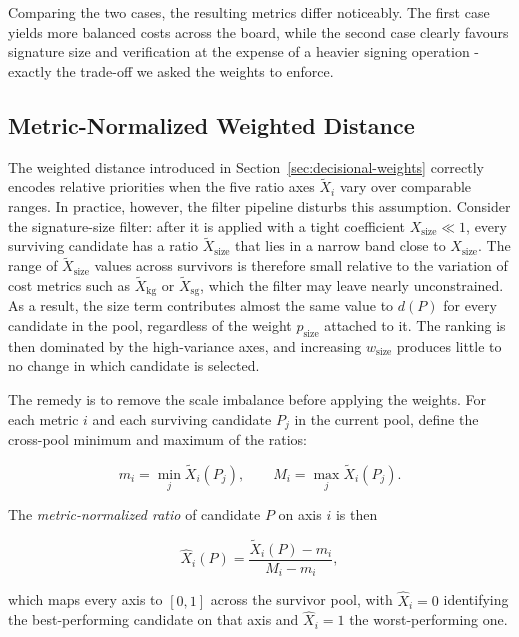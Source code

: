 Comparing the two cases, the resulting metrics differ noticeably. The first case yields more balanced costs across the board, while the second case clearly favours signature size and verification at the expense of a heavier signing operation - exactly the trade-off we asked the weights to enforce. 

\subsection{Metric-Normalized Weighted Distance} \label{sec:normalized-weights}

The weighted distance introduced in Section~\ref{sec:decisional-weights} correctly encodes relative priorities when the five ratio axes $\widetilde{X}_i$ vary over comparable ranges.
In practice, however, the filter pipeline disturbs this assumption.
Consider the signature-size filter: after it is applied with a tight coefficient $X_{\text{size}} \ll 1$, every surviving candidate has a ratio $\widetilde{X}_{\text{size}}$ that lies in a narrow band close to $X_{\text{size}}$.
The range of $\widetilde{X}_{\text{size}}$ values across survivors is therefore small relative to the variation of cost metrics such as $\widetilde{X}_{\text{kg}}$ or $\widetilde{X}_{\text{sg}}$, which the filter may leave nearly unconstrained.
As a result, the size term contributes almost the same value to $d(P)$ for every candidate in the pool, regardless of the weight $p_{\text{size}}$ attached to it.
The ranking is then dominated by the high-variance axes, and increasing $w_{\text{size}}$ produces little to no change in which candidate is selected.

The remedy is to remove the scale imbalance before applying the weights.
For each metric $i$ and each surviving candidate $P_j$ in the current pool, define the cross-pool minimum and maximum of the ratios:

\begin{equation}
    m_i = \min_j \widetilde{X}_i(P_j), \qquad
    M_i = \max_j \widetilde{X}_i(P_j).
    \label{eq:metric_range}
\end{equation}

The \emph{metric-normalized ratio} of candidate $P$ on axis $i$ is then

\begin{equation}
    \widehat{X}_i(P) = \frac{\widetilde{X}_i(P) - m_i}{M_i - m_i},
    \label{eq:metric_norm}
\end{equation}

which maps every axis to $[0, 1]$ across the survivor pool, with $\widehat{X}_i = 0$ identifying the best-performing candidate on that axis and $\widehat{X}_i = 1$ the worst-performing one.

